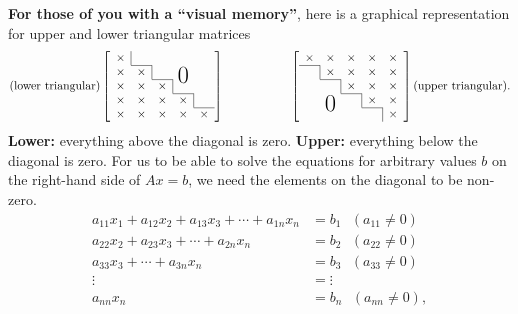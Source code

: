 \documentclass[letterpaper]{book}
\begin{document}
\vspace*{1cm}


{\bf For those of you with a ``visual memory''}, here is a graphical representation for upper and lower triangular matrices
\begin{equation}
\text{(lower triangular)}
 \left[
    \begin{array}{ccccc}
  \x     & \bordl &       &  & \\ \cline{2-2}
\x       & \x    & \bordl  &\bigzero & \\ \cline{3-3}
 \x      & \x    & \x  & \bordl    & \\ \cline{4-4}
  \x      & \x    & \x  &  \x & \bordl  \\  \cline{5-5}
    \x    & \x       & \x    & \x    & \x 
  \end{array}\right] \hspace*{2cm}  
\left[
    \begin{array}{ccccc}
    \x    & \x       & \x    & \x    & \x \\ \cline{1-1}
    \bord & \x       & \x    & \x    & \x \\ \cline{2-2}
          & \bord    & \x    & \x    & \x \\ \cline{3-3}
          & \bigzero & \bord & \x    & \x \\ \cline{4-4}
          &          &       & \bord & \x \\ 
  \end{array}\right]  \text{(upper triangular).} 
\end{equation}
\textbf{ Lower:}  everything above the diagonal is zero. \textbf{Upper:} everything below the diagonal is zero. For us to be able to solve the equations for arbitrary values $b$ on the right-hand side of $Ax=b$, we need the elements on the diagonal to be non-zero.\\
\begin{equation}
\label{eq:GeneralUpperTriangular}
    \begin{aligned}
     a_{11} x_1 + a_{12} x_2 + a_{13} x_3+ \cdots +  a_{1n} x_n &=b_1 ~~~(a_{11} \neq 0)\\
     a_{22} x_2 + a_{23} x_3 + \cdots +  a_{2n} x_n &=b_2 ~~~(a_{22} \neq 0)\\
       a_{33} x_3 + \cdots +  a_{3n} x_n &=b_3 ~~~(a_{33} \neq 0)\\
     \vdots &= \vdots \\
     a_{nn} x_n &= b_n  ~~~(a_{nn} \neq 0),
    \end{aligned}
\end{equation}
\end{document}
